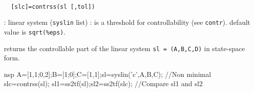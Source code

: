 \begin{mandesc}
   \\ %
\end{mandesc}
\begin{calling_sequence}
\begin{verbatim}
  [slc]=contrss(sl [,tol])  
\end{verbatim}
\end{calling_sequence}
\begin{parameters}
  \begin{varlist}
    : linear system (\verb!syslin! list)
    : is a threshold for controllability (see \verb!contr!).  default value is \verb!sqrt(%eps)!.
  \end{varlist}
\end{parameters}
\begin{mandescription}
  returns the controllable part of the linear 
  system \verb!sl = (A,B,C,D)! in state-space form.
\end{mandescription}
\begin{examples}
  \begin{mintednsp}{nsp}
    A=[1,1;0,2];B=[1;0];C=[1,1];sl=syslin('c',A,B,C);  //Non minimal
    slc=contrss(sl);
    sl1=ss2tf(sl);sl2=ss2tf(slc);      //Compare sl1 and sl2
  \end{mintednsp}
\end{examples}
\begin{manseealso}
       
\end{manseealso}
